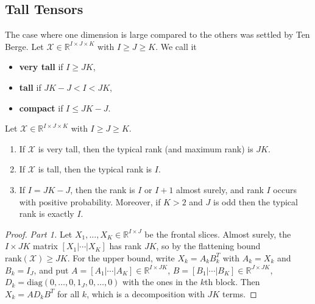\subsection{Tall Tensors}

  The case where one dimension is large compared to the others was settled by Ten Berge. Let $\mathcal{X} \in \mathbb{R}^{I \times J \times K}$ with $I \geq J \geq K$. We call it
  \begin{itemize}
    \item \textbf{very tall} if $I \geq JK$,
    \item \textbf{tall} if $JK - J < I < JK$,
    \item \textbf{compact} if $I \leq JK - J$.
  \end{itemize}

  \begin{theorem}
    \label{thm:tall}
    Let $\mathcal{X} \in \mathbb{R}^{I \times J \times K}$ with $I \geq J \geq K$.
    \begin{enumerate}
      \item If $\mathcal{X}$ is very tall, then the typical rank (and maximum rank) is $JK$.
      \item If $\mathcal{X}$ is tall, then the typical rank is $I$.
      \item If $I = JK - J$, then the rank is $I$ or $I + 1$ almost surely, and rank $I$ occurs with positive probability. Moreover, if $K > 2$ and $J$ is odd then the typical rank is exactly $I$.
    \end{enumerate}
  \end{theorem}

  \begin{proof}
    \textit{Part 1.} Let $X_1, \ldots, X_K \in \mathbb{R}^{I \times J}$ be the frontal slices. Almost surely, the $I \times JK$ matrix $[X_1 | \cdots | X_K]$ has rank $JK$, so by the flattening bound $\mathrm{rank}(\mathcal{X}) \geq JK$. For the upper bound, write $X_k = A_k B_k^T$ with $A_k = X_k$ and $B_k = I_J$, and put $A = [A_1 | \cdots | A_K] \in \mathbb{R}^{I \times JK}$, $B = [B_1 | \cdots | B_K] \in \mathbb{R}^{J \times JK}$, $D_k = \mathrm{diag}(0, \ldots, 0, 1_J, 0, \ldots, 0)$ with the ones in the $k$th block. Then $X_k = A D_k B^T$ for all $k$, which is a decomposition with $JK$ terms.
  \end{proof}

